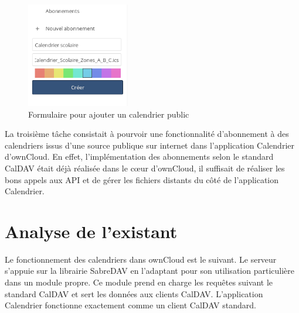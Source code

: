 \documentclass[10pt,a4paper, twoside]{report}
\begin{document}
	\begin{figure}
		\begin{center}
			\includegraphics[width=0.40\textwidth]{images/creation_abonnement.png}
		\end{center}
		\caption*{Formulaire pour ajouter un calendrier public}
	\end{figure}
	
	La troisième tâche consistait à pourvoir une fonctionnalité d'abonnement à des calendriers issus d'une source publique sur internet dans l'application Calendrier d'ownCloud. En effet, l'implémentation des abonnements selon le standard CalDAV était déjà réalisée dans le cœur d'ownCloud, il suffisait de réaliser les bons appels aux API et de gérer les fichiers distants du côté de l'application Calendrier.
	
	\chapter{Analyse de l'existant}
	
	Le fonctionnement des calendriers dans ownCloud est le suivant. Le serveur s'appuie sur la librairie SabreDAV en l'adaptant pour son utilisation particulière dans un module propre. Ce module prend en charge les requêtes suivant le standard CalDAV et sert les données aux clients CalDAV.
	L'application Calendrier fonctionne exactement comme un client CalDAV standard.
	
\end{document}
